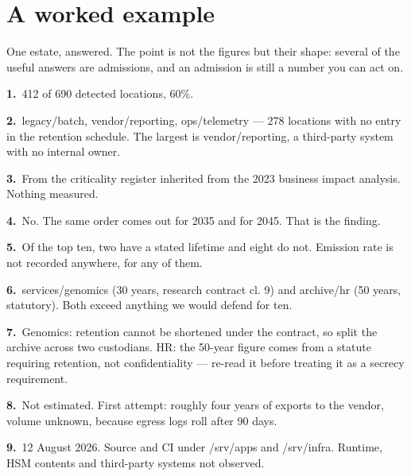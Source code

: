 \documentclass[10pt,a4paper]{article}
\begin{document}
\section*{A worked example}
{\small One estate, answered. The point is not the figures but their shape: several of the useful answers are admissions, and an admission is still a number you can act on.\par}\vspace{4pt}
\noindent\textbf{1.}\ {\small 412 of 690 detected locations, 60\%.}\par\vspace{3pt}
\noindent\textbf{2.}\ {\small legacy/batch, vendor/reporting, ops/telemetry --- 278 locations with no entry in the retention schedule. The largest is vendor/reporting, a third-party system with no internal owner.}\par\vspace{3pt}
\noindent\textbf{3.}\ {\small From the criticality register inherited from the 2023 business impact analysis. Nothing measured.}\par\vspace{3pt}
\noindent\textbf{4.}\ {\small No. The same order comes out for 2035 and for 2045. That is the finding.}\par\vspace{3pt}
\noindent\textbf{5.}\ {\small Of the top ten, two have a stated lifetime and eight do not. Emission rate is not recorded anywhere, for any of them.}\par\vspace{3pt}
\noindent\textbf{6.}\ {\small services/genomics (30 years, research contract cl. 9) and archive/hr (50 years, statutory). Both exceed anything we would defend for ten.}\par\vspace{3pt}
\noindent\textbf{7.}\ {\small Genomics: retention cannot be shortened under the contract, so split the archive across two custodians. HR: the 50-year figure comes from a statute requiring retention, not confidentiality --- re-read it before treating it as a secrecy requirement.}\par\vspace{3pt}
\noindent\textbf{8.}\ {\small Not estimated. First attempt: roughly four years of exports to the vendor, volume unknown, because egress logs roll after 90 days.}\par\vspace{3pt}
\noindent\textbf{9.}\ {\small 12 August 2026. Source and CI under /srv/apps and /srv/infra. Runtime, HSM contents and third-party systems not observed.}\par\vspace{3pt}
\end{document}
